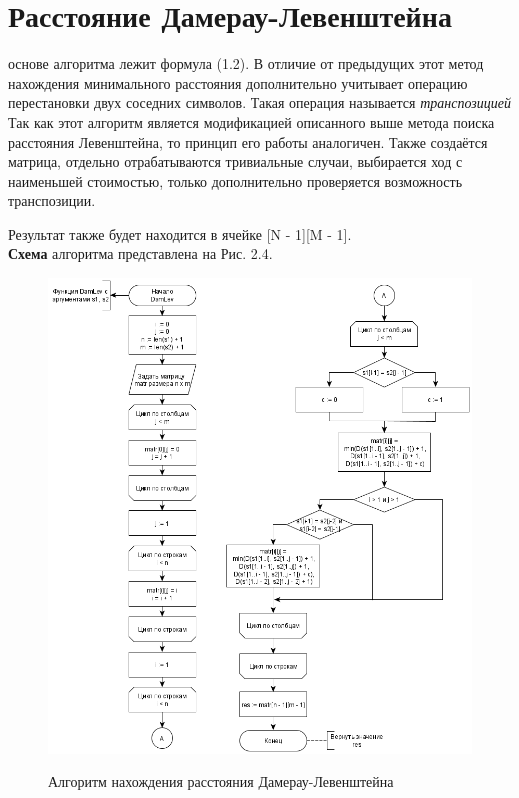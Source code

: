 \documentclass[12pt]{report}
\begin{document}
\section{Расстояние Дамерау-Левенштейна}
 основе алгоритма лежит формула (1.2). В отличие от предыдущих этот метод нахождения минимального расстояния дополнительно учитывает операцию перестановки двух соседних символов. Такая операция называется \textit{транспозицией}\\

Так как этот алгоритм является модификацией описанного выше метода поиска расстояния Левенштейна, то принцип его работы аналогичен. Также создаётся матрица, отдельно отрабатываются тривиальные случаи, выбирается ход с наименьшей стоимостью, только дополнительно проверяется возможность транспозиции.

Результат также будет находится в ячейке [N - 1][M - 1].\\

\textbf{Схема} алгоритма представлена на Рис. 2.4.

\begin{figure}[h]
	\begin{center}
		{\includegraphics[scale = 0.63]{DanLev}}
		\caption{Алгоритм нахождения расстояния Дамерау-Левенштейна}
	\end{center}
\end{figure}
\end{document}
